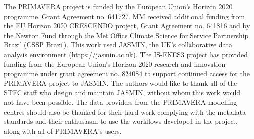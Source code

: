 \documentclass[gmd, manuscript]{copernicus}
\begin{document}
\begin{acknowledgements}
The PRIMAVERA project is funded by the European Union's Horizon 2020 programme, Grant Agreement no. 641727. MM received additional funding from the EU Horizon 2020 CRESCENDO project, Grant Agreement no. 641816 and by the Newton Fund through the Met Office Climate Science for Service Partnership Brazil (CSSP Brazil). This work used JASMIN, the UK's collaborative data analysis environment (https://jasmin.ac.uk). The IS-ENES3 project has provided funding from the European Union’s Horizon 2020 research and innovation programme under grant agreement no. 824084 to support continued access for the PRIMAVERA project to JASMIN. The authors would like to thank all of the STFC staff who design and maintain JASMIN, without whom this work would not have been possible. The data providers from the PRIMAVERA modelling centres should also be thanked for their hard work complying with the metadata standards and their enthusiasm to use the workflows developed in the project, along with all of PRIMAVERA's users.
\end{acknowledgements}



%
%
%





\end{document}
